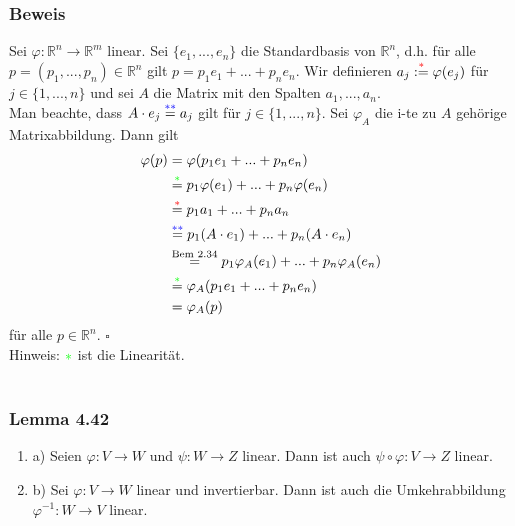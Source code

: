 \documentclass{article}
\begin{document}
\subsubsection*{Beweis}
Sei $\varphi: \mathbb{R}^n \rightarrow \mathbb{R}^m$ linear. Sei $\{e_1,...,e_n\}$ die Standardbasis von $\mathbb{R}^n$, d.h. für alle $p=(p_1,...,p_n) \in \mathbb{R}^n$ gilt $p = p_1 e_1 + ... + p_n e_n$. 
Wir definieren $a_j \overset{\textcolor{red}{*}}{:=} \varphi(e_j)$ für $j \in \{1,...,n\}$ und sei $A$ die Matrix mit den Spalten $a_1,...,a_n$. \\
Man beachte, dass $A \cdot e_j \overset{\textcolor{blue}{**}}{=} a_j$ gilt für $j \in \{1,...,n\}$. Sei $\varphi_A$ die i-te zu $A$ gehörige Matrixabbildung. Dann gilt \\
\begin{align*}
    \varphi(p) &= \varphi(p_1 e_1 + ... + p_n e_n) \\
    &\overset{\textcolor{green}{*}}{=} p_1 \varphi(e_1) + ... + p_n \varphi(e_n) \\
    &\overset{\textcolor{red}{*}}{=} p_1 a_1 + ... + p_n a_n \\
    &\overset{\textcolor{blue}{**}}{=} p_1 (A \cdot e_1) + ... + p_n (A \cdot e_n) \\
    &\overset{\text{Bem 2.34}}{=} p_1 \varphi_A(e_1) + ... + p_n \varphi_A(e_n) \\
    &\overset{\textcolor{green}{*}}{=} \varphi_A(p_1 e_1 + ... + p_n e_n) \\
    &= \varphi_A(p) \\
\end{align*}
für alle $p \in \mathbb{R}^n$. $\square$ \\
Hinweis: $\textcolor{green}{*}$ ist die Linearität.\\
\\
\subsubsection*{Lemma 4.42}
\begin{enumerate}
    \item a) Seien $\varphi : V \rightarrow W$ und $\psi: W \rightarrow Z$ linear. Dann ist auch $\psi \circ \varphi: V \rightarrow Z$ linear. \\
    \item b) Sei $\varphi: V \rightarrow W$ linear und invertierbar. Dann ist auch die Umkehrabbildung $\varphi^{-1}: W \rightarrow V$ linear. \\
\end{enumerate}
\end{document}
